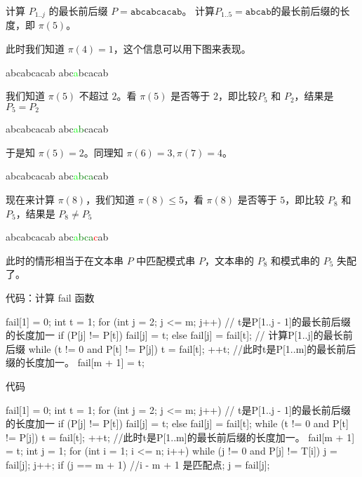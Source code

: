 \documentclass{ctexbeamer}
\newcommand{\red}[1]{\textcolor{red}{#1}}
\newcommand{\green}[1]{\textcolor{green}{#1}}
\newcommand{\lime}[1]{\textcolor{lime}{#1}}
\newcommand{\str}[1]{\texttt{#1}}
\begin{document}
\begin{frame}[fragile]{计算 $P_{1..j}$ 的最长前后缀} %
$P = \str{abcabcacab}$。
    计算$P_{1..5} = \str{abcab}$的最长前后缀的长度，即 $\pi(5)$。

此时我们知道 $\pi(4) = 1$，这个信息可以用下图来表现。
\begin{tverb}
   abcabcacab
abc\lime{a}bcacab
\end{tverb}
我们知道 $\pi(5)$ 不超过 $2$。看 $\pi(5)$ 是否等于 $2$，即比较$P_5$ 和 $P_2$，结果是 $P_5 = P_2$
\begin{tverb}
   abcabcacab
abc\lime{a}\green{b}cacab
\end{tverb}
于是知 $\pi(5)=2$。同理知 $\pi(6) = 3, \pi(7) = 4$。

\begin{tverb}
   abcabcacab
abc\lime{a}\green{bca}cab
\end{tverb}

现在来计算 $\pi(8)$，我们知道 $\pi(8) \le 5$，看 $\pi(8)$ 是否等于 $5$，即比较 $P_8$ 和 $P_5$，结果是 $P_8 \ne P_5$
\begin{tverb}
   abcabcacab
abc\lime{a}\green{bca}\red{c}ab
\end{tverb}
此时的情形相当于在文本串 $P$ 中匹配模式串 $P$，文本串的 $P_8$ 和模式串的 $P_5$ 失配了。
\end{frame}




\begin{frame}[fragile]{代码：计算 fail 函数}
\begin{tcolorbox}
\begin{cverb}[fontsize=\normalsize]
fail[1] = 0;
int t = 1;
for (int j = 2; j <= m; j++) {
// t是P[1..j - 1]的最长前后缀的长度加一
  if (P[j] != P[t])
    fail[j] = t;
  else
    fail[j] = fail[t];
  // 计算P[1..j]的最长前后缀
  while (t != 0 and P[t] != P[j])
    t = fail[t];
  ++t;
}
//此时t是P[1..m]的最长前后缀的长度加一。
fail[m + 1] = t;
\end{cverb}
\end{tcolorbox}

\end{frame}


\begin{frame}[fragile]{代码}
  \begin{tcolorbox}
  \begin{cverb}
  fail[1] = 0;
  int t = 1;
  for (int j = 2; j <= m; j++) {
  // t是P[1..j - 1]的最长前后缀的长度加一
    if (P[j] != P[t])
      fail[j] = t;
    else
      fail[j] = fail[t];
    while (t != 0 and P[t] != P[j])
      t = fail[t];
    ++t;
  }
  //此时t是P[1..m]的最长前后缀的长度加一。
  fail[m + 1] = t;
  int j = 1;
  for (int i = 1; i <= n; i++) {
    while (j != 0 and P[j] != T[i])
      j = fail[j];
    j++;
    if (j == m + 1) {
      //i - m + 1 是匹配点;
      j = fail[j];
    }
  }
  \end{cverb}
  \end{tcolorbox}
  
  \end{frame}
\end{document}

